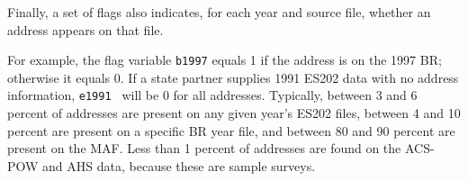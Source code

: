 % 
% 
% 


Finally, a set of flags also indicates, for each year and source file,
whether an address appears on that file. 

% 

For example, the flag variable {\tt b1997} equals 1 if the address is on the 1997 BR; otherwise it equals 0.
If a state partner supplies 1991 ES202 data with no address information,
{\tt e1991 } will be 0 for all
addresses. Typically,  between 3 and 6 percent of addresses are present on
any given year's ES202 files, 
between 4 and 10 percent are present on a specific BR year file, and 
between 80 and 90 percent are present on the MAF. 
Less than 1 percent of addresses are found on the ACS-POW and AHS
data, because these are sample surveys. 

